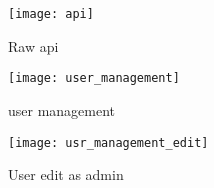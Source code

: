 \documentclass{article}
\begin{document}
\begin{figure}[!h]
    \centering
    \texttt{[image: api]}
    \caption{Raw api}
    \label{fig:raw api}
\end{figure}

\begin{figure}[!h]
    \centering
    \texttt{[image: user\_management]}
    \caption{user management}
    \label{fig:user management}
\end{figure}

\begin{figure}[!h]
    \centering
    \texttt{[image: usr\_management\_edit]}
    \caption{User edit as admin}
    \label{fig:usr_management_edit}
\end{figure}
\end{document}
